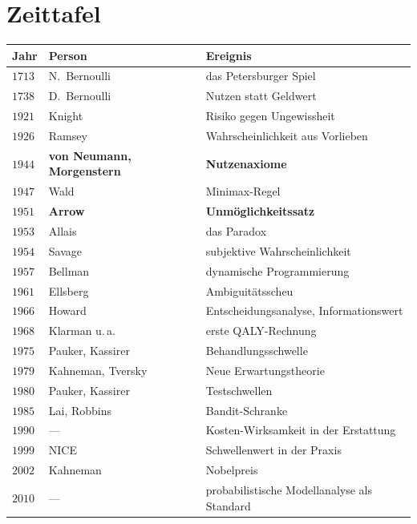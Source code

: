 \section{Zeittafel}

\begin{merksatz}
\begin{center}
{\small
\renewcommand{\arraystretch}{1.32}
\begin{tabular}{@{}P{1.3cm}P{3.0cm}P{4.0cm}@{}}
\toprule
\textbf{Jahr} & \textbf{Person} & \textbf{Ereignis}\\
\midrule
$1713$ & N.\ Bernoulli & das Petersburger Spiel\\
$1738$ & D.\ Bernoulli & Nutzen statt Geldwert\\
$1921$ & Knight & Risiko gegen Ungewissheit\\
$1926$ & Ramsey & Wahrscheinlichkeit aus Vorlieben\\
$1944$ & \textbf{von Neumann, Morgenstern} & \textbf{Nutzenaxiome}\\
$1947$ & Wald & Minimax-Regel\\
$1951$ & \textbf{Arrow} & \textbf{Unmöglichkeitssatz}\\
$1953$ & Allais & das Paradox\\
$1954$ & Savage & subjektive Wahrscheinlichkeit\\
$1957$ & Bellman & dynamische Programmierung\\
$1961$ & Ellsberg & Ambiguitätsscheu\\
$1966$ & Howard & Entscheidungsanalyse, Informationswert\\
$1968$ & Klarman u.\,a. & erste QALY-Rechnung\\
$1975$ & Pauker, Kassirer & Behandlungsschwelle\\
$1979$ & Kahneman, Tversky & Neue Erwartungstheorie\\
$1980$ & Pauker, Kassirer & Testschwellen\\
$1985$ & Lai, Robbins & Bandit-Schranke\\
$1990$ & --- & Kosten-Wirksamkeit in der Erstattung\\
$1999$ & NICE & Schwellenwert in der Praxis\\
$2002$ & Kahneman & Nobelpreis\\
$2010$ & --- & probabilistische Modellanalyse als Standard\\
\bottomrule
\end{tabular}}
\end{center}
\end{merksatz}

